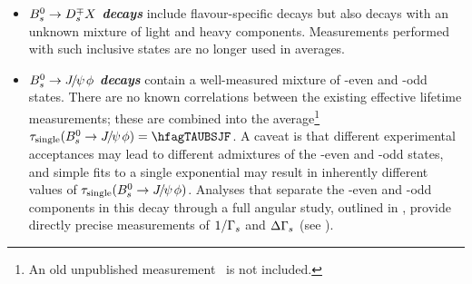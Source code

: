 \begin{itemize}
\item
{\bf\em \boldmath $B^0_s\to D_s^{\mp} X$ decays}
include flavour-specific decays but also decays 
with an unknown mixture of light and heavy components. 
Measurements performed with such inclusive states are
no longer used in averages. 

\item
{\bf\em 
{\boldmath $B^0_s \to {J\mskip -3mu/\mskip -2mu\psi\mskip 2mu}\phi$ \unboldmath}decays}
contain a well-measured mixture of \CP-even and \CP-odd states.
There are no known correlations
between the existing 
\particle{\Bs\to \jpsi\phi}
effective lifetime measurements; these are combined  
into the average\footnote{
An old unpublished measurement~\cite{CDFnote8524:2007,*CDFnote8524:2007_cont} is not included.}
$\tau_{\rm single}(\Bs\to \jpsi \phi) = \hfagTAUBSJF$. %
A caveat is that different experimental acceptances
may lead to different admixtures of the 
\CP-even and \CP-odd states, and simple fits to a single
exponential may result in inherently different 
values of $\tau_{\rm single}(B^0_s\to {J\mskip -3mu/\mskip -2mu\psi\mskip 2mu} \phi)$.
Analyses that separate the \CP-even and \CP-odd components in
this decay through a full angular study, outlined in ,
provide directly precise measurements of $1/\Gamma_{s}$ and $\Delta\Gamma_{s}$ (see ).


\end{itemize}
